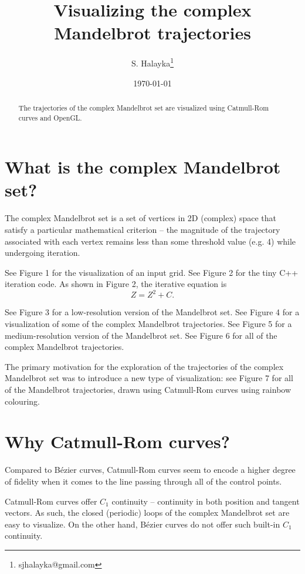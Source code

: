 \documentclass[12pt]{article}
\title{Visualizing the complex Mandelbrot trajectories}
\author{S. Halayka\footnote{sjhalayka@gmail.com}}
\date{\today}
\begin{document}
\maketitle

\begin{abstract}
The trajectories of the complex Mandelbrot set are visualized using Catmull-Rom curves and OpenGL.
\end{abstract}



\section{What is the complex Mandelbrot set?}

The complex Mandelbrot set is a set of vertices in 2D (complex) space that satisfy a particular mathematical criterion -- the magnitude of the trajectory associated with each vertex remains less than some threshold value (e.g. 4) while undergoing iteration.

See Figure 1 for the visualization of an input grid.
See Figure 2 for the tiny C++ iteration code.
As shown in Figure 2, the iterative equation is
\begin{equation}
Z = Z^2 + C.
\end{equation}

See Figure 3 for a low-resolution version of the Mandelbrot set.
See Figure 4 for a visualization of some of the complex Mandelbrot trajectories.
See Figure 5 for a medium-resolution version of the Mandelbrot set.
See Figure 6 for all of the complex Mandelbrot trajectories.

The primary motivation for the exploration of the trajectories of the complex Mandelbrot set was to introduce a new type of visualization: see Figure 7 for all of the Mandelbrot trajectories, drawn using Catmull-Rom curves using rainbow colouring.


\section{Why Catmull-Rom curves?}

Compared to  B\'ezier curves, Catmull-Rom curves seem to encode a higher degree of fidelity when it comes to the line passing through all of the control points.

Catmull-Rom curves offer $C_1$ continuity -- continuity in both position and tangent vectors.
As such, the closed (periodic) loops of the complex Mandelbrot set are easy to visualize.
On the other hand, B\'ezier curves do not offer such built-in $C_1$ continuity.
\end{document}
